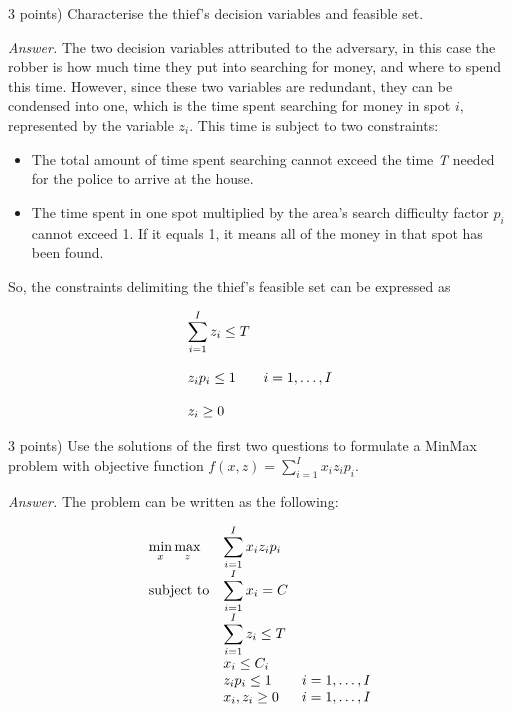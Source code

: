 \documentclass[10pt]{article}
\newenvironment{exercise}[2][Exercise]{\begin{trivlist}
  \item[\hskip \labelsep {\bfseries #1}\hskip \labelsep {\bfseries #2.}]}{\end{trivlist}}
\begin{document}
\begin{exercise}{5.2} (3 points) 
Characterise the thief's decision variables and feasible set.

\textit{Answer.}
The two decision variables attributed to the adversary, in this case the robber is how much time they put into searching for money, and where to spend this time. However, since these two variables are redundant, they can be condensed into one, which is the time spent searching for money in spot $i$, represented by the variable $z_i$. This time is subject to two constraints:

\begin{itemize}
    \item The total amount of time spent searching cannot exceed the time \textit{T} needed for the police to arrive at the house.
    \item The time spent in one spot multiplied by the area's search difficulty factor $p_i$ cannot exceed 1. If it equals 1, it means all of the money in that spot has been found.
\end{itemize}

So, the constraints delimiting the thief's feasible set can be expressed as

\begin{equation}\label{eq:thief}
\begin{array}{ll@{}lll}

\displaystyle\sum\limits_{i=1}^{I} z_i \leq T \\ \\
z_i p_i \leq 1 && i=1 ,\dots, I\\ \\
z_i \geq 0
\end{array}
\end{equation}
\end{exercise}

\begin{exercise}{5.3} (3 points) Use the solutions of the first two questions to formulate a MinMax problem with objective function $f(x, z) =\sum\limits_{i=1}^{I} x_i z_i p_i $. 

\textit{Answer.}
The problem can be written as the following:

\begin{equation}
\begin{array}{ll@{}llll}
\displaystyle\min_{x}\displaystyle\max_{z} & \displaystyle\sum\limits_{i=1}^{I} x_i z_i p_i\\
\text{subject to} 
& \displaystyle\sum\limits_{i=1}^{I} x_i = C\\
& \displaystyle\sum\limits_{i=1}^{I} z_i \leq T \\
& x_i \leq C_i \\
& z_i p_i \leq 1 &&i=1 ,\dots, I\\
                & x_i,z_i \geq 0 &&i=1 ,\dots, I
\end{array}
\end{equation}

\end{exercise}
\end{document}
